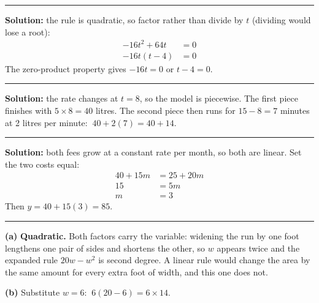 \documentclass[12pt]{article}
\begin{document}
\vspace{0.2cm}\noindent\rule{\linewidth}{0.2pt}


\textbf{Solution:} the rule is quadratic, so factor rather than divide by $t$ (dividing would lose a root):
\begin{align*}
  -16t^2 + 64t &= 0 \\
  -16t(t - 4) &= 0
\end{align*}
The zero-product property gives $-16t = 0$ or $t - 4 = 0$. 

\vspace{0.2cm}\noindent\rule{\linewidth}{0.2pt}


\textbf{Solution:} the rate changes at $t = 8$, so the model is piecewise. The first piece finishes with $5 \times 8 = 40$ litres. The second piece then runs for $15 - 8 = 7$ minutes at 2 litres per minute: $\ 40 + 2(7) = 40 + 14$. 

\vspace{0.2cm}\noindent\rule{\linewidth}{0.2pt}


\textbf{Solution:} both fees grow at a constant rate per month, so both are linear. Set the two costs equal:
\begin{align*}
  40 + 15m &= 25 + 20m \\
  15 &= 5m \\
  m &= 3
\end{align*}
Then $y = 40 + 15(3) = 85$. 

\vspace{0.2cm}\noindent\rule{\linewidth}{0.2pt}


\textbf{(a)} \textbf{Quadratic.} Both factors carry the variable: widening the run by one foot lengthens one pair of sides and shortens the other, so $w$ appears twice and the expanded rule $20w - w^2$ is second degree. A linear rule would change the area by the same amount for every extra foot of width, and this one does not.

\textbf{(b)} Substitute $w = 6$: $\ 6(20 - 6) = 6 \times 14$. 
\end{document}

